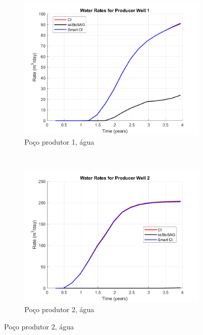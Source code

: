 \begin{figure}[!ht]
	\centering
	\begin{subfigure}[b]{.3\textwidth}
		\includegraphics[width=\textwidth]{figs/resultadosEgg/imgsim1/EGG_WaterWell1_Zoom}
		\caption{Po\c{c}o produtor 1, \'{a}gua}
		\label{EGG1_WaterWell1}
	\end{subfigure}
	~
	\begin{subfigure}[b]{.3\textwidth}
		\includegraphics[width=\textwidth]{figs/resultadosEgg/imgsim1/EGG_WaterWell2_Zoom}
		\caption{Po\c{c}o produtor 2, \'{a}gua}
		\label{EGG1_WaterWell2}
	\end{subfigure}
	

\end{figure}
